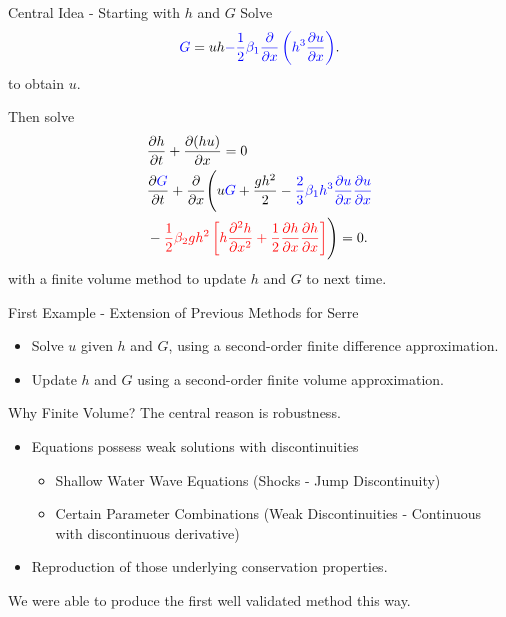 \documentclass[pdf]{beamer}
\begin{document}
\begin{frame}{Central Idea - Starting with $h$ and $G$}
Solve
\begin{gather*}
{\color{blue} G} = uh {\color{blue} - \frac{1}{2} \beta_1\dfrac{\partial }{\partial x} \left ( h^3 \dfrac{\partial u}{\partial x} \right )}.
\end{gather*}
to obtain $u$.

\bigskip
\pause
Then solve
\begin{align*}
&\dfrac{\partial h}{\partial t} + \dfrac{\partial (hu)}{\partial x} = 0\\
&\dfrac{\partial {\color{blue} G} }{\partial t}  + \dfrac{\partial}{\partial x} \Bigg( u{\color{blue} G} + \dfrac{gh^2}{2} - {\color{blue} \frac{2}{3} \beta_1 h^3\dfrac{\partial u}{\partial x}\dfrac{\partial u}{\partial x} } \\ &- {\color{red}\frac{1}{2} \beta_2 g h^2  \left[h\frac{\partial^2 h}{\partial x^2} +   \frac{1}{2}\frac{\partial h}{\partial x}\frac{\partial h}{\partial x}\right] } \Bigg) = 0.
\end{align*}
with a finite volume method to update $h$ and $G$ to next time. 
\end{frame}

\begin{frame}{First Example - Extension of Previous Methods for Serre}
\begin{itemize}
	\item Solve $u$ given $h$ and $G$, using a second-order finite difference approximation.
	\item Update $h$ and $G$ using a second-order finite volume approximation.
\end{itemize}
\end{frame}

\begin{frame}{Why Finite Volume?}
The central reason is robustness.
\begin{itemize}
	\item Equations possess weak solutions with discontinuities 
	\begin{itemize}
	\item Shallow Water Wave Equations (Shocks - Jump Discontinuity)
	\item Certain Parameter Combinations (Weak Discontinuities - Continuous with discontinuous derivative)
	\end{itemize}
	\item Reproduction of those underlying conservation properties.
\end{itemize}
We were able to produce the first well validated method this way. 
\end{frame}
\end{document}
